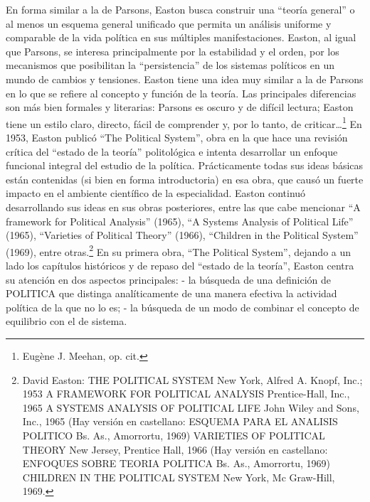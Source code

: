 \documentclass[
]{book}
\begin{document}
En forma similar a la de Parsons, Easton busca construir una ``teoría general'' o al menos un esquema general unificado que permita un análisis uniforme y comparable de la vida política en sus múltiples manifestaciones. Easton, al igual que Parsons, se interesa principalmente por la estabilidad y el orden, por los mecanismos que posibilitan la ``persistencia'' de los sistemas políticos en un mundo de cambios y tensiones. Easton tiene una idea muy similar a la de Parsons en lo que se refiere al concepto y función de la teoría. Las principales diferencias son más bien formales y literarias: Parsons es oscuro y de difícil lectura; Easton tiene un estilo claro, directo, fácil de comprender y, por lo tanto, de criticar\ldots{}\footnote{Eugène J. Meehan, op. cit.} En 1953, Easton publicó ``The Political System'', obra en la que hace una revisión crítica del ``estado de la teoría'' politológica e intenta desarrollar un enfoque funcional integral del estudio de la política. Prácticamente todas sus ideas básicas están contenidas (si bien en forma introductoria) en esa obra, que causó un fuerte impacto en el ambiente científico de la especialidad. Easton continuó desarrollando sus ideas en sus obras posteriores, entre las que cabe mencionar ``A framework for Political Analysis'' (1965), ``A Systems Analysis of Political Life'' (1965), ``Varieties of Political Theory'' (1966), ``Children in the Political System'' (1969), entre otras.\footnote{David Easton: THE POLITICAL SYSTEM New York, Alfred A. Knopf, Inc.; 1953 A FRAMEWORK FOR POLITICAL ANALYSIS Prentice-Hall, Inc., 1965 A SYSTEMS ANALYSIS OF POLITICAL LIFE John Wiley and Sons, Inc., 1965 (Hay versión en castellano: ESQUEMA PARA EL ANALISIS POLITICO Bs. As., Amorrortu, 1969) VARIETIES OF POLITICAL THEORY New Jersey, Prentice Hall, 1966 (Hay versión en castellano: ENFOQUES SOBRE TEORIA POLITICA Bs. As., Amorrortu, 1969) CHILDREN IN THE POLITICAL SYSTEM New York, Mc Graw-Hill, 1969.} En su primera obra, ``The Political System'', dejando a un lado los capítulos históricos y de repaso del ``estado de la teoría'', Easton centra su atención en dos aspectos principales: - la búsqueda de una definición de POLITICA que distinga analíticamente de una manera efectiva la actividad política de la que no lo es; - la búsqueda de un modo de combinar el concepto de equilibrio con el de sistema.
\end{document}
